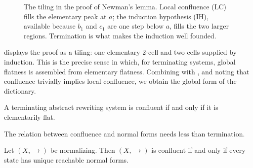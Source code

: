 \begin{figure}[t]
\centering
{}
\caption{The tiling in the proof of Newman's lemma. Local confluence (LC) fills the elementary peak at $a$; the induction hypothesis (IH), available because $b_1$ and $c_1$ are one step below $a$, fills the two larger regions. Termination is what makes the induction well founded.}
\label{fig:newman-tiling}
\end{figure}

 displays the proof as a tiling: one elementary $2$-cell and two cells supplied by induction. This is the precise sense in which, for terminating systems, global flatness is assembled from elementary flatness. Combining  with , and noting that confluence trivially implies local confluence, we obtain the global form of the dictionary.

\begin{corollary}
\label{cor:terminating-confluence-iff-flat}
A terminating abstract rewriting system is confluent if and only if it is elementarily flat.
\end{corollary}

The relation between confluence and normal forms needs less than termination.

\begin{theorem}
\label{thm:normalizing-confluence-iff-unf}
Let $(X,\to)$ be normalizing. Then $(X,\to)$ is confluent if and only if every state has unique reachable normal forms.
\end{theorem}

